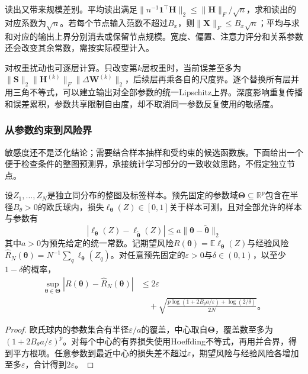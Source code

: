 读出又带来规模差别。平均读出满足$\lVert n^{-1}\bm{1}^{\top}\bm{H}\rVert_2\leq\lVert\bm{H}\rVert_F/\sqrt n$，求和读出的对应系数为$\sqrt n$。若每个节点输入范数不超过$B_x$，则$\lVert\bm{X}\rVert_F\leq B_x\sqrt n$；平均与求和对应的输出上界分别消去或保留节点规模。宽度、偏置、注意力评分和关系参数还会改变其余常数，需按实际模型计入。

对权重扰动也可逐层计算。只改变第$k$层权重时，当前误差至多为$\lVert\bm{S}\rVert_2\lVert\bm{H}^{(k)}\rVert_F\lVert\Delta\bm{W}^{(k)}\rVert_2$，后续层再乘各自的尺度界。逐个替换所有层并用三角不等式，可以建立输出对全部参数的统一Lipschitz上界。深度影响重复传播和误差累积，参数共享限制自由度，却不取消同一参数反复使用的敏感度。

\subsubsection{从参数约束到风险界}
\label{sec:gnn-risk-bound}

敏感度还不是泛化结论；需要结合样本抽样和受约束的候选函数族。下面给出一个便于检查条件的整图预测界，承接统计学习部分的一致收敛思路，不假定独立节点。

\begin{theorem}[有界参数图预测的覆盖界]
\label{thm:gnn-cover-generalization}
设$Z_1,\ldots,Z_N$是独立同分布的整图及标签样本。预先固定的参数域$\bm{\Theta}\subseteq\mathbb{R}^{p}$包含在半径$B_\theta>0$的欧氏球内，损失$\ell_{\bm{\theta}}(Z)\in[0,1]$关于样本可测，且对全部允许的样本与参数有
\[
  |\ell_{\bm{\theta}}(Z)-\ell_{\widetilde{\bm{\theta}}}(Z)|
    \leq a\lVert\bm{\theta}-\widetilde{\bm{\theta}}\rVert_2
\]
其中$a>0$为预先给定的统一常数。记期望风险$R(\bm{\theta})=\mathbb{E}\ell_{\bm{\theta}}(Z)$与经验风险$\widehat R_N(\bm{\theta})=N^{-1}\sum_q\ell_{\bm{\theta}}(Z_q)$。对任意预先固定的$\varepsilon>0$与$\delta\in(0,1)$，以至少$1-\delta$的概率，
\begin{equation}
  \begin{aligned}
    \sup_{\bm{\theta}\in\bm{\Theta}}
      |R(\bm{\theta})-\widehat R_N(\bm{\theta})|
      &\leq2\varepsilon\\
      &\quad+\sqrt{\frac{p\log(1+2B_\theta a/\varepsilon)
        +\log(2/\delta)}{2N}}\text{。}
  \end{aligned}
  \label{eq:gnn-cover-risk}
\end{equation}
\end{theorem}
\begin{proof}
欧氏球内的参数集合有半径$\varepsilon/a$的覆盖，中心取自$\bm{\Theta}$，覆盖数至多为$(1+2B_\theta a/\varepsilon)^p$。对每个中心的有界损失使用Hoeffding不等式，再用并合界，得到平方根项。任意参数到最近中心的损失差不超过$\varepsilon$，期望风险与经验风险各增加至多$\varepsilon$，合计得到$2\varepsilon$。
\end{proof}

